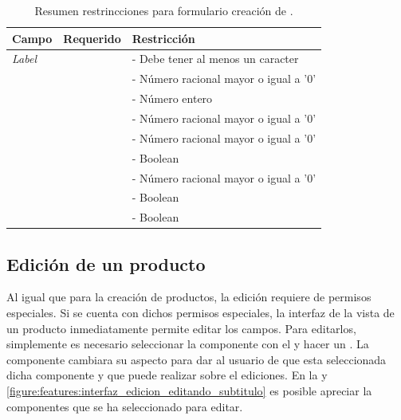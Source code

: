 		\begin{table}[H] 
		    \centering
			\begin{tabular}{ |l|c||l| }
				\hline Campo & Requerido & Restricción \\ \hline
				\multirow{1}{*}{\textit{Label}}		&  \multirow{1}{*}{\checkmark} 	& - Debe tener al menos un caracter \\ \hline
				\multirow{1}{*}{\textit{\WeightForm}}	&  \multirow{1}{*}{\checkmark} 	& - Número racional mayor o igual a '0' \\ \hline
				\multirow{1}{*}{\quantityForm}	&  \multirow{1}{*}{\checkmark} 	& - Número entero \\ \hline
				\multirow{1}{*}{\msrpSIGLAS}		&  \multirow{1}{*}{} 			& - Número racional mayor o igual a '0' \\ \hline
				\multirow{1}{*}{\priceForm}		&  \multirow{1}{*}{\checkmark} 	& - Número racional mayor o igual a '0' \\ \hline
				\multirow{1}{*}{\denyForm}		&  \multirow{1}{*}{\checkmark} 	& - Boolean \\ \hline
				\multirow{1}{*}{\warnForm}		&  \multirow{1}{*}{} 			& - Número racional mayor o igual a '0' \\ \hline
				\multirow{1}{*}{\taxableForm}	&  \multirow{1}{*}{\checkmark} 	& - Boolean \\ \hline
				\multirow{1}{*}{\trackingForm}	&  \multirow{1}{*}{\checkmark} 	& - Boolean \\ \hline
			\end{tabular}
		 	\caption{Resumen restrincciones para formulario creación de \optionsForm.}
		    \label{tab:solution:products:create:form:product:generic:options}
		\end{table}

	\subsection{Edición de un producto}\label{chapter:section:productos:subsection:edicion}

		Al igual que para la creación de productos, la edición requiere de permisos especiales. Si se cuenta con dichos permisos especiales, la interfaz de la vista de un producto inmediatamente permite editar los campos. Para editarlos, simplemente es necesario seleccionar la componente con el \mousePC y hacer un \click. La componente cambiara su aspecto para dar \feedback al usuario de que esta seleccionada dicha componente y que puede realizar sobre el ediciones. En la  y \ref{figure:features:interfaz_edicion_editando_subtitulo} es posible apreciar la componentes que se ha seleccionado para editar.


